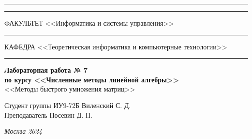 \documentclass[a4paper, 14pt]{extarticle}
\begin{document}
\begin{titlepage}
\vspace{-25pt}
\hspace{-35pt}\rule{\textwidth}{2.3pt}

\vspace*{-20.3pt}
\hspace{-35pt}\rule{\textwidth}{0.4pt}

\vspace{1.5ex}
\hspace{-35pt} \noindent \small ФАКУЛЬТЕТ\hspace{80pt} <<Информатика и системы управления>>

\vspace*{-16pt}
\hspace{47pt}\rule{0.83\textwidth}{0.4pt}

\vspace{0.5ex}
\hspace{-35pt} \noindent \small КАФЕДРА\hspace{50pt} <<Теоретическая информатика и компьютерные технологии>>

\vspace*{-16pt}
\hspace{30pt}\rule{0.866\textwidth}{0.4pt}
  
\vspace{11em}

\begin{center}
\Large {\bf Лабораторная работа № 7} \\ 
\large {\bf по курсу <<Численные методы линейной алгебры>>} \\
\large <<Методы быстрого умножения матриц>> 
\end{center}\normalsize

\vspace{8em}


\begin{flushright}
  {Студент группы ИУ9-72Б Виленский С. Д. \hspace*{15pt}\\ 
  \vspace{2ex}
  Преподаватель Посевин Д. П.\hspace*{15pt}}
\end{flushright}

\bigskip

\vfill
 

\begin{center}
\textsl{Москва 2024}
\end{center}
\end{titlepage}
\end{document}

